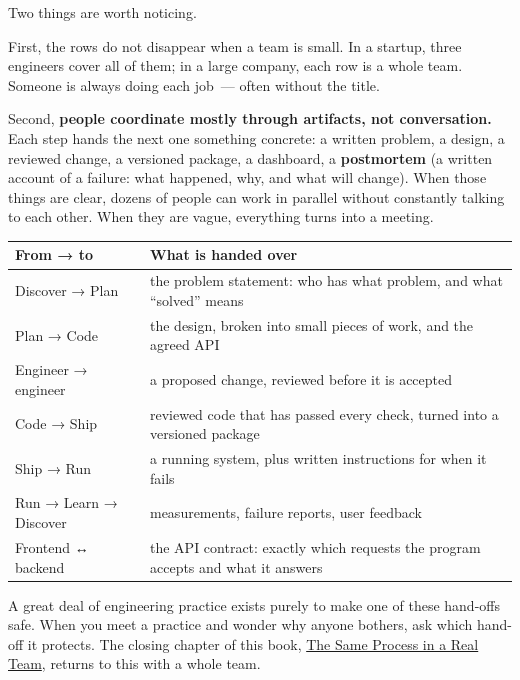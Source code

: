 Two things are worth noticing.

First, the rows do not disappear when a team is small. In a startup, three engineers cover all of them; in a large company, each row is a whole team. Someone is always doing each job~--- often without the title.

Second, \textbf{people coordinate mostly through artifacts, not conversation.} Each step hands the next one something concrete: a written problem, a design, a reviewed change, a versioned package, a dashboard, a \textbf{postmortem} (a written account of a failure: what happened, why, and what will change). When those things are clear, dozens of people can work in parallel without constantly talking to each other. When they are vague, everything turns into a meeting.


{\def\LTcaptype{none} %
\begin{longtable}[]{@{}
  >{\raggedright\arraybackslash}p{}
  >{\raggedright\arraybackslash}p{}@{}}
\toprule\noalign{}
\begin{minipage}[b]{\linewidth}\raggedright
From → to
\end{minipage} & \begin{minipage}[b]{\linewidth}\raggedright
What is handed over
\end{minipage} \\
\midrule\noalign{}
\endhead
\bottomrule\noalign{}
\endlastfoot
Discover → Plan & the problem statement: who has what problem, and what ``solved'' means \\
Plan → Code & the design, broken into small pieces of work, and the agreed API \\
Engineer → engineer & a proposed change, reviewed before it is accepted \\
Code → Ship & reviewed code that has passed every check, turned into a versioned package \\
Ship → Run & a running system, plus written instructions for when it fails \\
Run → Learn → Discover & measurements, failure reports, user feedback \\
Frontend ↔ backend & the API contract: exactly which requests the program accepts and what it answers \\
\end{longtable}
}

A great deal of engineering practice exists purely to make one of these hand-offs safe. When you meet a practice and wonder why anyone bothers, ask which hand-off it protects. The closing chapter of this book, \hyperref[ch:the-same-process-in-a-team]{The Same Process in a Real Team}, returns to this with a whole team.

